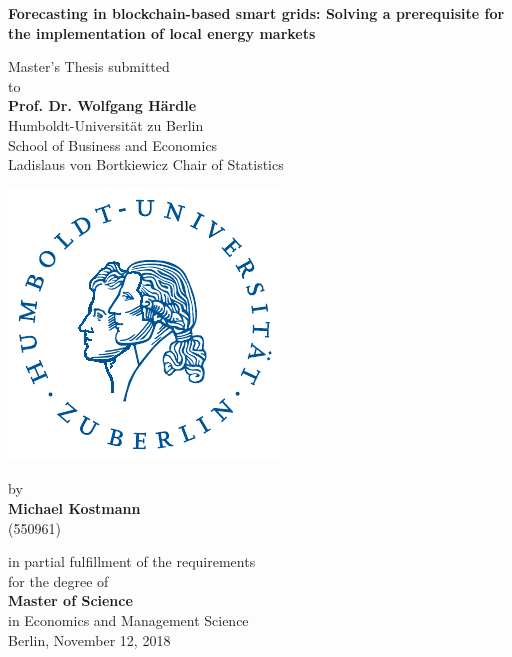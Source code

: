 \begin{center}
\vspace{1cm}

    {\Large{\bf Forecasting in blockchain-based smart grids: Solving a prerequisite for the implementation of local energy markets}} \vspace{1cm}


    {\normalsize Master's Thesis submitted\\\vspace{0.5cm}
    to}\\\vspace{0.5cm}
    {\normalsize{\bf Prof. Dr. Wolfgang H\"ardle}} \\\vspace{0.5cm}
    {\normalsize Humboldt-Universit\"at zu Berlin \\
    School of Business and Economics \\
    Ladislaus von Bortkiewicz Chair of Statistics} \vspace{1cm}
    
    \includegraphics[]{thesis/figures/logo.pdf}
    \vspace{1cm}

    {\normalsize by \\\vspace{0.5cm}
    {\bf Michael Kostmann} \\
    (550961)} \vspace{1cm}


    {\normalsize in partial fulfillment of the requirements \\
    for the degree of \\
    {\bf Master of Science} \\
    in Economics and Management Science \\\vspace{1cm}
    Berlin, November 12,  2018}

\end{center}
